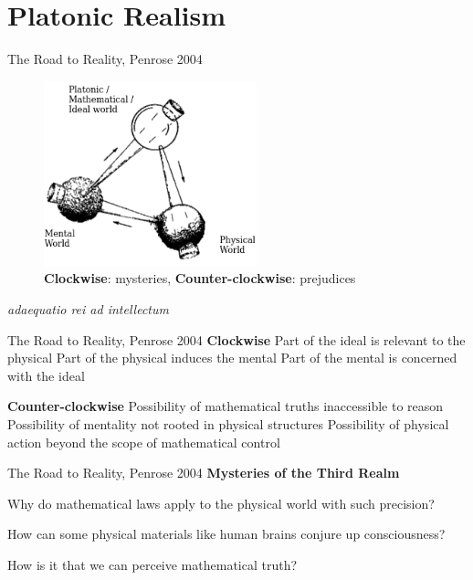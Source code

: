 \documentclass[xcolor=dvipsnames]{beamer}
\begin{document}
\section{Platonic Realism}


\begin{frame}{The Road to Reality, Penrose 2004}
  \begin{figure}
    \centering
    \includegraphics[width=0.55\textwidth]{three-worlds-penrose}
    \caption {\textbf{Clockwise}: mysteries,\;\; \textbf{Counter-clockwise}: prejudices}
  \end{figure}
  \centering
  \emph{adaequatio rei ad intellectum}
\end{frame}

\begin{frame}{The Road to Reality, Penrose 2004}
\textbf{Clockwise}\newline
Part of the ideal is relevant to the physical\newline
Part of the physical induces the mental\newline
Part of the mental is concerned with the ideal\newline

\textbf{Counter-clockwise}\newline
Possibility of mathematical truths inaccessible to reason\newline
Possibility of mentality not rooted in physical structures\newline
Possibility of physical action beyond the scope of mathematical control\newline
\end{frame}


\begin{frame}{The Road to Reality, Penrose 2004}
\textbf{Mysteries of the Third Realm}\newline\vspace{3mm}

Why do mathematical laws apply to the physical world with such precision?\newline\vspace{3mm}

How can some physical materials like human brains conjure up consciousness?\newline\vspace{3mm}

How is it that we can perceive mathematical truth?\newline\vspace{3mm}
\end{frame}
\end{document}
